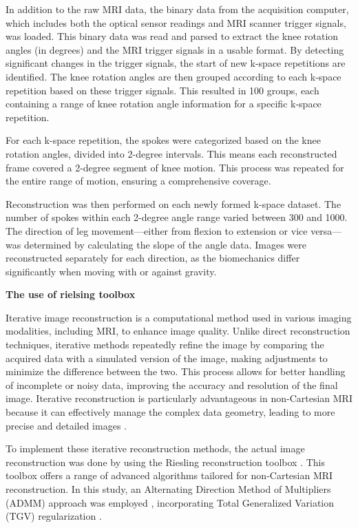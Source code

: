 \documentclass{micro-econ-thesis}
\begin{document}
In addition to the raw MRI data, the binary data from the acquisition computer, which includes both the optical sensor readings and MRI scanner trigger signals, was loaded. This binary data was read and parsed to extract the knee rotation angles (in degrees) and the MRI trigger signals in a usable format. By detecting significant changes in the trigger signals, the start of new k-space repetitions are identified. The knee rotation angles are then grouped according to each k-space repetition based on these trigger signals. This resulted in 100 groups, each containing a range of knee rotation angle information for a specific k-space repetition. 

For each k-space repetition, the spokes were categorized based on the knee rotation angles, divided into 2-degree intervals. This means each reconstructed frame covered a 2-degree segment of knee motion. This process was repeated for the entire range of motion, ensuring a comprehensive coverage.  

Reconstruction was then performed on each newly formed k-space dataset. The number of spokes within each 2-degree angle range varied between 300 and 1000. The direction of leg movement—either from flexion to extension or vice versa—was determined by calculating the slope of the angle data. Images were reconstructed separately for each direction, as the biomechanics differ significantly when moving with or against gravity. 

\textbf{The use of rielsing toolbox}

Iterative image reconstruction is a computational method used in various imaging modalities, including MRI, to enhance image quality. Unlike direct reconstruction techniques, iterative methods repeatedly refine the image by comparing the acquired data with a simulated version of the image, making adjustments to minimize the difference between the two. This process allows for better handling of incomplete or noisy data, improving the accuracy and resolution of the final image. Iterative reconstruction is particularly advantageous in non-Cartesian MRI because it can effectively manage the complex data geometry, leading to more precise and detailed images \parencite{block_undersampled_2007}.

To implement these iterative reconstruction methods, the actual image reconstruction was done by using the Riesling reconstruction toolbox \parencite{wood2020riesling}. This toolbox offers a range of advanced algorithms tailored for non-Cartesian MRI reconstruction. In this study, an Alternating Direction Method of Multipliers (ADMM) approach was employed \parencite{MAL-016}, incorporating Total Generalized Variation (TGV) regularization \parencite{tgv}. 
\end{document}
